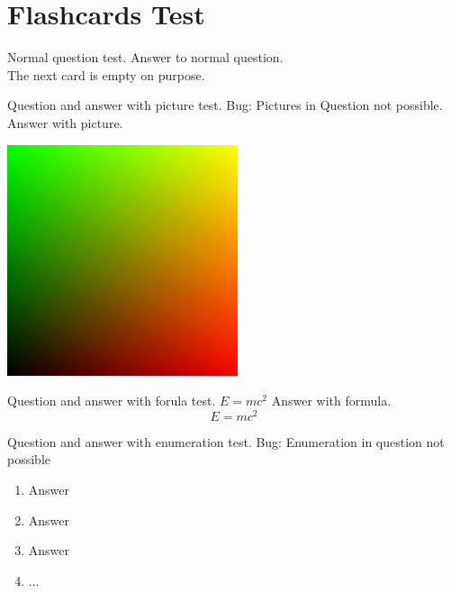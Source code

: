 \documentclass{../flashcards}
\begin{document}
\section{Flashcards Test}

\begin{card}{Normal question test.}
Answer to normal question.\\
The next card is empty on purpose.
\end{card}

\begin{card}{}

\end{card}

\begin{card}{Question and answer with picture test. Bug: Pictures in Question not possible.}
Answer with picture.\\[0.5cm]
\begin{center}
\includegraphics[scale=0.5]{gradient.png} 
\end{center}
\end{card}

\begin{card}{Question and answer with forula test. $E=mc^2$}
Answer with formula. $$E=mc^2$$
\end{card}

\begin{card}{Question and answer with enumeration test. Bug: Enumeration in question not possible}
\begin{enumerate}
\item Answer
\item Answer
\item Answer
\item ...
\end{enumerate}
\end{card}
\end{document}
